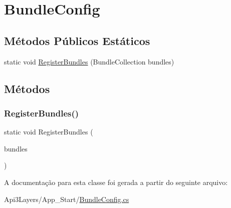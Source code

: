 \hypertarget{classApi3Layers_1_1BundleConfig}{}\section{Bundle\+Config}
\label{classApi3Layers_1_1BundleConfig}
\subsection*{Métodos Públicos Estáticos}
\begin{DoxyCompactItemize}
\item 
static void \hyperlink{classApi3Layers_1_1BundleConfig_afab9ce33b79d8441026ebdfebdf1e91b}{Register\+Bundles} (Bundle\+Collection bundles)
\end{DoxyCompactItemize}


\subsection{Métodos}
\mbox{\label{classApi3Layers_1_1BundleConfig_afab9ce33b79d8441026ebdfebdf1e91b}} 
\subsubsection{\texorpdfstring{Register\+Bundles()}{RegisterBundles()}}
{\footnotesize\ttfamily static void Register\+Bundles (\begin{DoxyParamCaption}\item[{Bundle\+Collection}]{bundles }\end{DoxyParamCaption})\hspace{0.3cm}{\ttfamily [static]}}



A documentação para esta classe foi gerada a partir do seguinte arquivo\+:\begin{DoxyCompactItemize}
\item 
Api3\+Layers/\+App\+\_\+\+Start/\hyperlink{BundleConfig_8cs}{Bundle\+Config.\+cs}\end{DoxyCompactItemize}
